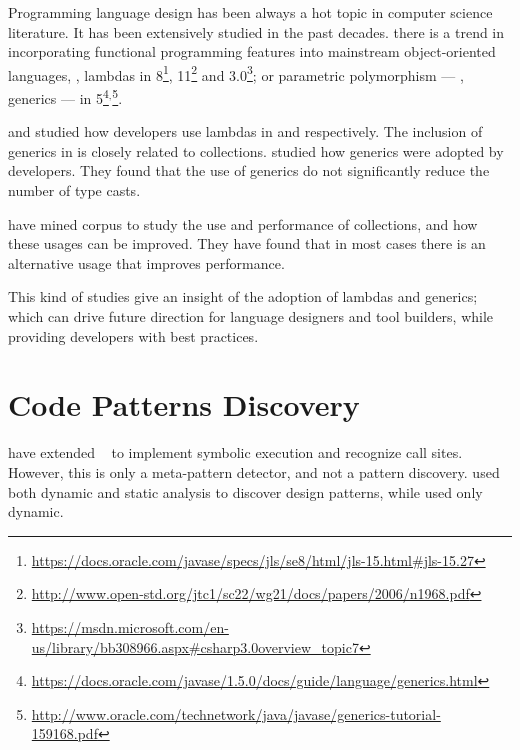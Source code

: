 Programming language design has been always a hot topic in computer science literature.
It has been extensively studied in the past decades.
there is a trend in incorporating functional programming features into mainstream object-oriented languages, \eg, lambdas in \java{} 8\footnote{\url{https://docs.oracle.com/javase/specs/jls/se8/html/jls-15.html\#jls-15.27}}, \cpp{}11\footnote{\url{http://www.open-std.org/jtc1/sc22/wg21/docs/papers/2006/n1968.pdf}} and \cs{} 3.0\footnote{\url{https://msdn.microsoft.com/en-us/library/bb308966.aspx\#csharp3.0overview\_topic7}}; or parametric polymorphism --- \ie{}, generics --- in \java{} 5\footnote{\url{https://docs.oracle.com/javase/1.5.0/docs/guide/language/generics.html}}\(^{,}\)\footnote{\url{http://www.oracle.com/technetwork/java/javase/generics-tutorial-159168.pdf}}.

\cite{mazinanianUnderstandingUseLambda2017} and \cite{uesbeckEmpiricalStudyImpact2016} studied how developers use lambdas in \java{} and \cpp{} respectively.
The inclusion of generics in \java{} is closely related to collections. 
\cite{parninJavaGenericsAdoption2011,parninAdoptionUseJava2013} studied how generics were adopted by \java{} developers.
They found that the use of generics do not significantly reduce the number of type casts.

\cite{costaEmpiricalStudyUsage2017} have mined \github{} corpus to study the use and performance of collections, and how these usages can be improved.
They have found
that in most cases there is an alternative usage that improves performance.

This kind of studies give an insight of the adoption of lambdas and generics; which can drive future direction for language designers and tool builders, while providing developers with best practices.

\section{Code Patterns Discovery }
\label{sec:lr:patterns}

\cite{posnettTHEXMiningMetapatterns2010} have extended \asm{}~\cite{brunetonASMCodeManipulation2002,kuleshovUsingASMFramework2007} to implement symbolic execution and recognize call sites.
However, this is only a meta-pattern detector, and not a pattern discovery.
\cite{huDynamicAnalysisDesign2008} used both dynamic and static analysis to discover design patterns, while \cite{arcelliDesignPatternDetection2008} used only dynamic.

